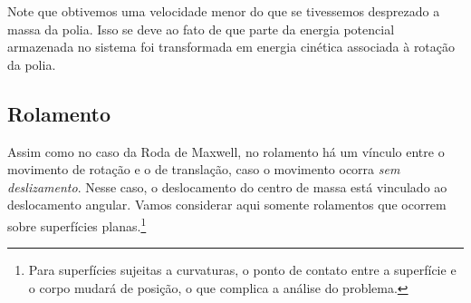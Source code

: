 Note que obtivemos uma velocidade menor do que se tivessemos desprezado a massa da polia. Isso se deve ao fato de que parte da energia potencial armazenada no sistema foi transformada em energia cinética associada à rotação da polia.


\subsection{Rolamento}

Assim como no caso da Roda de Maxwell, no rolamento há um vínculo entre o movimento de rotação e o de translação, caso o movimento ocorra \emph{sem deslizamento}. Nesse caso, o deslocamento do centro de massa está vinculado ao deslocamento angular. Vamos considerar aqui somente rolamentos que ocorrem sobre superfícies planas.\footnote{Para superfícies sujeitas a curvaturas, o ponto de contato entre a superfície e o corpo mudará de posição, o que complica a análise do problema.}

